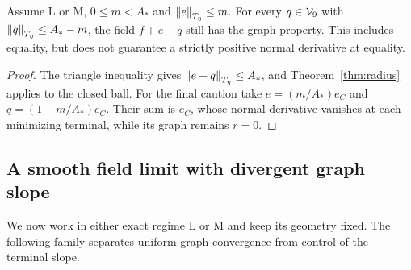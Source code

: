 \documentclass[11pt,a4paper]{article}
\begin{document}
\begin{corollary}
\label{cor:budget}
Assume L or M, $0\le m<A_*$ and $\left\lVert e\right\rVert_{T_\eta}\le m$.
For every $q\in\mathcal V_9$ with $\left\lVert q\right\rVert_{T_\eta}\le A_*-m$, the field $f+e+q$
still has the graph property. This includes equality, but does not guarantee a strictly
positive normal derivative at equality.
\end{corollary}
\begin{proof}
The triangle inequality gives $\left\lVert e+q\right\rVert_{T_\eta}\le A_*$, and
Theorem~\ref{thm:radius} applies to the closed ball. For the final
caution take $e=(m/A_*)e_C$ and $q=(1-m/A_*)e_C$.
Their sum is $e_C$, whose normal derivative vanishes at each
minimizing terminal, while its graph remains $r=0$.
\end{proof}

\subsection{A smooth field limit with divergent graph slope}
\label{sec:degeneration}

We now work in either exact regime L or M and keep its geometry fixed.
The following family separates uniform graph convergence from
control of the terminal slope.
\end{document}
